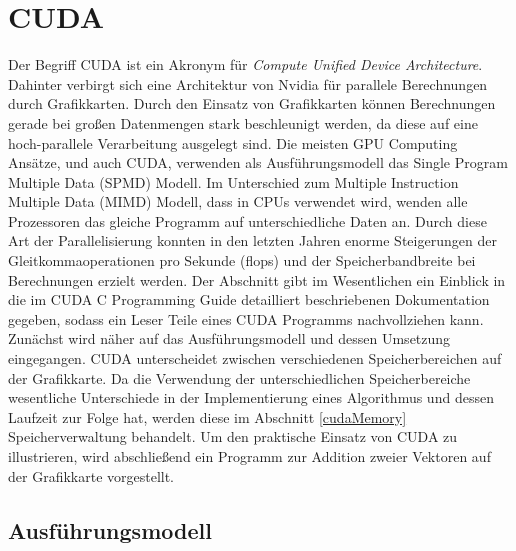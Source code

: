 \section{CUDA}

Der Begriff CUDA ist ein Akronym für \textit{Compute Unified Device Architecture}. Dahinter verbirgt sich eine Architektur von Nvidia für parallele Berechnungen durch Grafikkarten. Durch den Einsatz von Grafikkarten können Berechnungen gerade bei großen Datenmengen stark beschleunigt werden, da diese auf eine hoch-parallele Verarbeitung ausgelegt sind. Die meisten GPU Computing Ansätze, und auch CUDA, verwenden als Ausführungsmodell das Single Program Multiple Data (SPMD) Modell. Im Unterschied zum Multiple Instruction Multiple Data (MIMD) Modell, dass in CPUs verwendet wird, wenden alle Prozessoren das gleiche Programm auf unterschiedliche Daten an. Durch diese Art der Parallelisierung konnten in den letzten Jahren enorme Steigerungen der Gleitkommaoperationen pro Sekunde (flops) und der Speicherbandbreite bei Berechnungen erzielt werden.\newline
Der Abschnitt gibt im Wesentlichen ein Einblick in die im CUDA C Programming Guide \cite{cud2012} detailliert beschriebenen Dokumentation gegeben, sodass ein Leser Teile eines CUDA Programms nachvollziehen kann. Zunächst wird näher auf das Ausführungsmodell und dessen Umsetzung eingegangen. CUDA unterscheidet zwischen verschiedenen Speicherbereichen auf der Grafikkarte. Da die Verwendung der unterschiedlichen Speicherbereiche wesentliche Unterschiede in der Implementierung eines Algorithmus und dessen Laufzeit zur Folge hat, werden diese im Abschnitt \ref{cudaMemory} Speicherverwaltung behandelt. Um den praktische Einsatz von CUDA zu illustrieren, wird abschließend ein Programm zur Addition zweier Vektoren auf der Grafikkarte vorgestellt.

\subsection{Ausführungsmodell}

